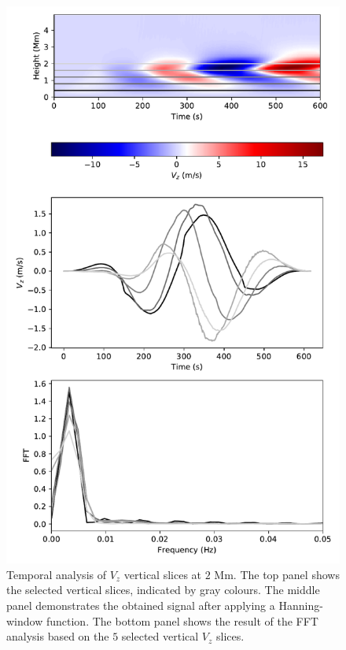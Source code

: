 \documentclass[physics,article,submit,pdftex,moreauthors]{Definitions/mdpi}
\begin{document}
\begin{figure}
    \centering
    \label{fft_sim2}
    \includegraphics[scale=0.55]{fft_sim2.pdf}
    \caption{Temporal analysis of $V_{z}$ vertical slices at $2$ Mm. The top panel shows the selected vertical slices, indicated by gray colours. The middle panel demonstrates the obtained signal after applying a Hanning-window function. The bottom panel shows the result of the FFT analysis based on the $5$ selected vertical $V_{z}$ slices.}

\end{figure}
\end{document}
